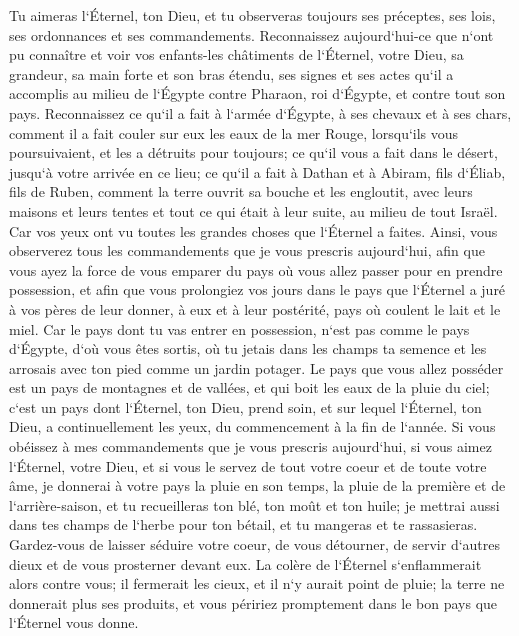 \verse Tu aimeras l`Éternel, ton Dieu, et tu observeras toujours ses préceptes, ses lois, ses ordonnances et ses commandements. 
\verse Reconnaissez aujourd`hui-ce que n`ont pu connaître et voir vos enfants-les châtiments de l`Éternel, votre Dieu, sa grandeur, sa main forte et son bras étendu, 
\verse ses signes et ses actes qu`il a accomplis au milieu de l`Égypte contre Pharaon, roi d`Égypte, et contre tout son pays. 
\verse Reconnaissez ce qu`il a fait à l`armée d`Égypte, à ses chevaux et à ses chars, comment il a fait couler sur eux les eaux de la mer Rouge, lorsqu`ils vous poursuivaient, et les a détruits pour toujours; 
\verse ce qu`il vous a fait dans le désert, jusqu`à votre arrivée en ce lieu; 
\verse ce qu`il a fait à Dathan et à Abiram, fils d`Éliab, fils de Ruben, comment la terre ouvrit sa bouche et les engloutit, avec leurs maisons et leurs tentes et tout ce qui était à leur suite, au milieu de tout Israël. 
\verse Car vos yeux ont vu toutes les grandes choses que l`Éternel a faites. 
\verse Ainsi, vous observerez tous les commandements que je vous prescris aujourd`hui, afin que vous ayez la force de vous emparer du pays où vous allez passer pour en prendre possession, 
\verse et afin que vous prolongiez vos jours dans le pays que l`Éternel a juré à vos pères de leur donner, à eux et à leur postérité, pays où coulent le lait et le miel. 
\verse Car le pays dont tu vas entrer en possession, n`est pas comme le pays d`Égypte, d`où vous êtes sortis, où tu jetais dans les champs ta semence et les arrosais avec ton pied comme un jardin potager. 
\verse Le pays que vous allez posséder est un pays de montagnes et de vallées, et qui boit les eaux de la pluie du ciel; 
\verse c`est un pays dont l`Éternel, ton Dieu, prend soin, et sur lequel l`Éternel, ton Dieu, a continuellement les yeux, du commencement à la fin de l`année. 
\verse Si vous obéissez à mes commandements que je vous prescris aujourd`hui, si vous aimez l`Éternel, votre Dieu, et si vous le servez de tout votre coeur et de toute votre âme, 
\verse je donnerai à votre pays la pluie en son temps, la pluie de la première et de l`arrière-saison, et tu recueilleras ton blé, ton moût et ton huile; 
\verse je mettrai aussi dans tes champs de l`herbe pour ton bétail, et tu mangeras et te rassasieras. 
\verse Gardez-vous de laisser séduire votre coeur, de vous détourner, de servir d`autres dieux et de vous prosterner devant eux. 
\verse La colère de l`Éternel s`enflammerait alors contre vous; il fermerait les cieux, et il n`y aurait point de pluie; la terre ne donnerait plus ses produits, et vous péririez promptement dans le bon pays que l`Éternel vous donne. 
